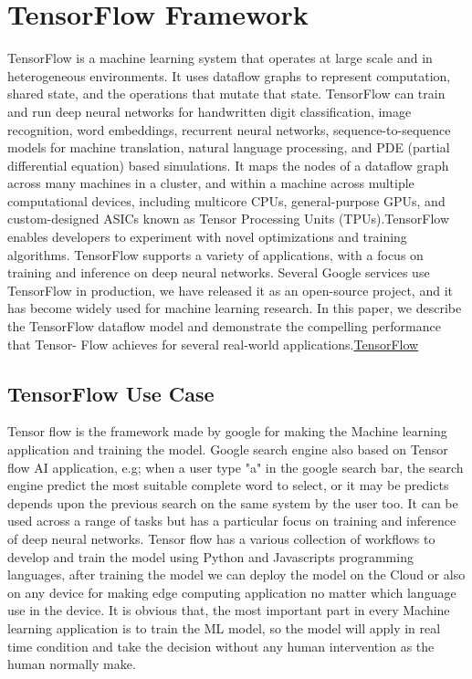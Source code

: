 \section{TensorFlow Framework} 

TensorFlow is a machine learning system that operates at large scale and in heterogeneous environments. It uses dataflow graphs to represent computation, shared state, and the operations that mutate that state. TensorFlow can train and run deep neural networks for handwritten digit classification, image recognition, word embeddings, recurrent neural networks, sequence-to-sequence models for machine translation, natural language processing, and PDE (partial differential equation) based simulations. It maps the nodes of a dataflow graph across many machines in a cluster, and within a machine across multiple computational devices, including multicore CPUs, general-purpose GPUs, and custom-designed ASICs known as Tensor Processing Units (TPUs).TensorFlow enables developers to experiment with novel optimizations and training algorithms. TensorFlow supports a variety of applications, with a focus on training and inference on deep neural networks. Several Google services use TensorFlow in production, we have released it as an open-source project, and it has become widely used for machine learning research. In this paper, we describe the TensorFlow dataflow model and demonstrate the compelling performance that Tensor- Flow achieves for several real-world applications.\href{https://www.tensorflow.org/overview/}{TensorFlow}

\subsection{TensorFlow Use Case}

Tensor flow is the framework made by google for making the Machine learning application and training the model. Google search engine also based on Tensor flow AI application, e.g; when a user type "a" in the google search bar, the search engine predict the most suitable complete word to select, or it may be predicts depends upon the previous search on the same system by the user too. It can be used across a range of tasks but has a particular focus on training and inference of deep neural networks. Tensor flow has a various collection of workflows to develop and train the model using Python and Javascripts programming languages, after training the model we can deploy the model on the Cloud or also on any device for making edge computing application no matter which language use in the device. It is obvious that, the most important part in every Machine learning application is to train the ML model, so the model will apply in real time condition and take the decision without any human intervention as the human normally make. 

